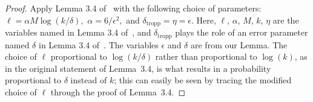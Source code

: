 \begin{proof}
Apply Lemma 3.4 of~\cite{Tro11} with the following choice of parameters:
$\ell = \alpha M \log(k/\delta),$
$\alpha = 6/\epsilon^2,$ and
$\delta_{\mathrm{tropp}} = \eta = \epsilon$.
Here, $\ell$, $\alpha$, $M$, $k$, $\eta$ are the variables named in Lemma 3.4 
of~\cite{Tro11},  and $\delta_{\mathrm{tropp}}$ plays the 
role of an error parameter named $\delta$ in Lemma 3.4 of~\cite{Tro11}.
The variables $\epsilon$ and $\delta$ are from our Lemma.
The choice of $\ell$ proportional to $\log(k/\delta)$ rather than proportional
to $\log(k)$, as in the original statement of Lemma~3.4, is what results in a 
probability proportional to $\delta$ instead of $k$; this can easily be seen
by tracing the modified choice of $\ell$ through the proof of Lemma~3.4.
\end{proof}

